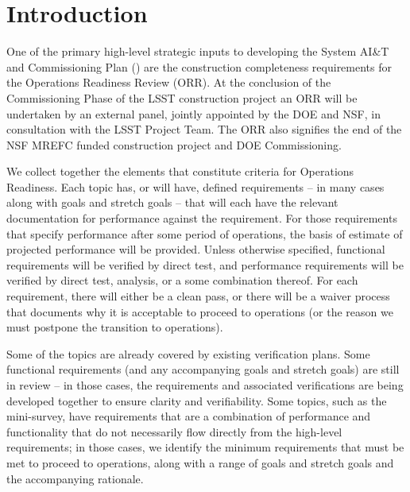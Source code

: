 
\section {Introduction}

One of the primary high-level strategic inputs to developing the System AI\&T and Commissioning Plan () are the construction completeness requirements for the Operations Readiness Review (ORR). At the conclusion of the Commissioning Phase of the LSST construction project an ORR will be undertaken by an external panel, jointly appointed by the DOE and NSF, in consultation with the LSST Project Team. The ORR also signifies the end of the NSF MREFC funded construction project and DOE Commissioning.

We collect together the elements that constitute criteria for Operations Readiness. Each topic has, or will have, defined requirements -- in many cases along with goals and stretch goals –  that will each have the relevant documentation for performance against the requirement. For those requirements that specify performance after some period of operations, the basis of estimate of projected performance will be provided. Unless otherwise specified, functional requirements will be verified by direct test, and performance requirements will be verified by direct test, analysis, or a some combination thereof. For each requirement, there will either be a clean pass, or there will be a waiver process that documents why it is acceptable to proceed to operations (or the reason we must postpone the transition to operations).

Some of the topics are already covered by existing verification plans. Some functional requirements (and any accompanying goals and stretch goals) are still in review -- in those cases, the requirements and associated verifications are being developed together to ensure clarity and verifiability. Some topics, such as the mini-survey, have requirements that are a combination of performance and functionality that do not necessarily flow directly from the high-level requirements; in those cases, we identify the minimum requirements that must be met to proceed to operations, along with a range of goals and stretch goals and the accompanying rationale.